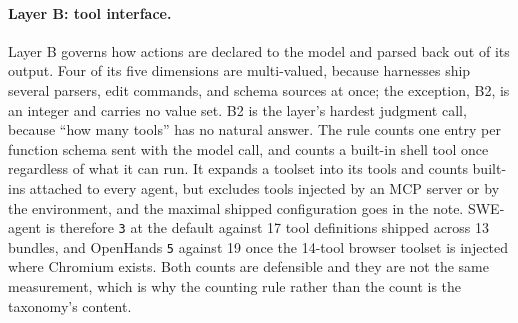 \paragraph{Layer B: tool interface.}\label{subsec:layer-b}
Layer B governs how actions are declared to the model and parsed back out of its output. Four of its
five dimensions are multi-valued, because harnesses ship several parsers, edit commands, and schema
sources at once; the exception, B2, is an integer and carries no value set. B2 is the layer's hardest
judgment call, because ``how many tools'' has no natural answer. The rule counts one entry per function
schema sent with the model call, and counts a built-in shell tool once regardless of what it can run. It
expands a toolset into its tools and counts built-ins attached to every agent, but excludes tools
injected by an MCP server or by the environment, and the maximal shipped configuration goes in the note.
SWE-agent is therefore \texttt{3} at the default against 17 tool definitions shipped across 13 bundles,
and OpenHands \texttt{5} against 19 once the 14-tool browser toolset is injected where Chromium exists.
Both counts are defensible and they are not the same measurement, which is why the counting rule rather
than the count is the taxonomy's content.


